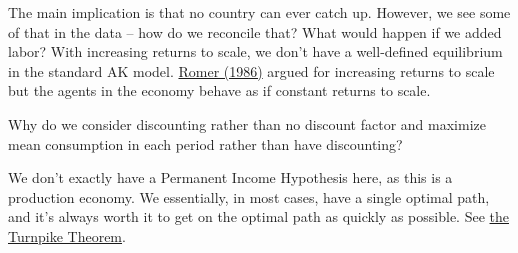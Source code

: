 \documentclass[10pt]{article}
\begin{document}
\begin{model}
	\begin{remark}
		The main implication is that no country can ever catch up. However, we see some of that in the data -- how do we reconcile that? What would happen if we added labor? With increasing returns to scale, we don't have a well-defined equilibrium in the standard AK model. \href{https://econpapers.repec.org/article/ucpjpolec/v_3a94_3ay_3a1986_3ai_3a5_3ap_3a1002-37.htm}{Romer (1986)} argued for increasing returns to scale but the agents in the economy behave as if constant returns to scale.
	\end{remark}
\end{model}

\begin{question}
	Why do we consider discounting rather than no discount factor and maximize mean consumption in each period rather than have discounting?
\end{question}
\begin{answer}
	We don't exactly have a Permanent Income Hypothesis here, as this is a production economy. We essentially, in most cases, have a single optimal path, and it's always worth it to get on the optimal path as quickly as possible. See \href{https://en.wikipedia.org/wiki/Turnpike_theory}{the Turnpike Theorem}.
\end{answer}
\end{document}
